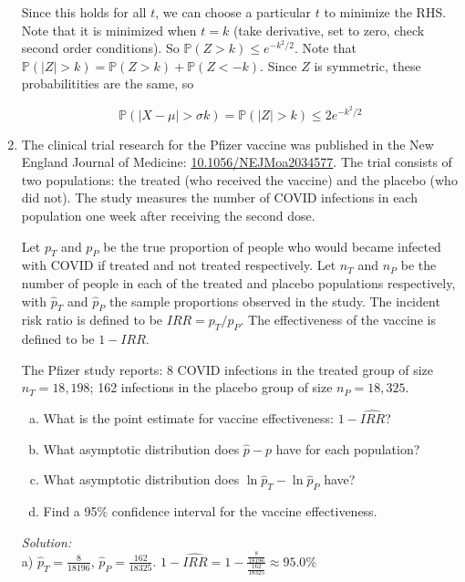 \documentclass[12pt]{article}
\newif\ifsln
\renewcommand{\P}{\mathbb{P}}
\begin{document}
\begin{enumerate}[1.]
Since this holds for all $t$, we can choose a particular $t$ to minimize the RHS. Note that it is minimized when $t = k$ (take derivative, set to zero, check second order conditions). So $\P(Z > k) \leq e^{-k^{2}/2}$. Note that $\P(|Z| > k) = \P(Z > k) + \P(Z < -k)$. Since $Z$ is symmetric, these probabilitities are the same, so 

\[\P(|X - \mu| > \sigma k) = \P(|Z| > k) \leq 2e^{-k^{2}/2}\]
\fi


\item The clinical trial research for the Pfizer vaccine was published in the New England Journal of Medicine: \href{http://www.doi.org/10.1056/NEJMoa2034577}{10.1056/NEJMoa2034577}. The trial consists of two populations: the treated (who received the vaccine) and the placebo (who did not). The study measures the number of COVID infections in each population one week after receiving the second dose.\smallskip

Let $p_{T}$ and $p_{P}$ be the true proportion of people who would became infected with COVID if treated and not treated respectively. Let $n_{T}$ and $n_{P}$ be the number of people in each of the treated and placebo populations respectively, with $\hat{p}_{T}$ and $\hat{p}_{P}$ the sample proportions observed in the study. The incident risk ratio is defined to be $IRR = p_{T} / p_{P}$. The effectiveness of the vaccine is defined to be $1 - IRR$.\smallskip

The Pfizer study reports: 8 COVID infections in the treated group of size $n_{T} = 18,198$; 162 infections in the placebo group of size $n_{P} = 18,325$. 
\begin{enumerate}[a)]
	\item What is the point estimate for vaccine effectiveness: $1 - \widehat{IRR}$?
	\item What asymptotic distribution does $\hat{p} - p$ have for each population?
	\item What asymptotic distribution does $\ln \hat{p}_{T} - \ln \hat{p}_{P}$ have?
	\item Find a 95\% confidence interval for the vaccine effectiveness.
\end{enumerate}

\ifsln
\textit{Solution:}\\
a) $\hat{p}_{T} = \frac{8}{18196}$, $\hat{p}_{P} = \frac{162}{18325}$. $ 1 - \widehat{IRR} = 1 - \frac{\frac{8}{18196}}{\frac{162}{18325}} \approx 95.0\%$\medskip


\end{enumerate}
\end{document}
